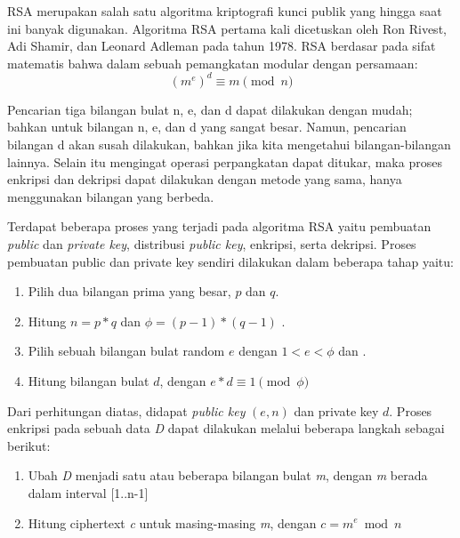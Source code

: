     RSA merupakan salah satu algoritma kriptografi kunci publik yang hingga saat ini banyak digunakan. Algoritma RSA pertama kali dicetuskan oleh Ron Rivest, Adi Shamir, dan Leonard Adleman pada tahun 1978. RSA berdasar pada sifat matematis bahwa dalam sebuah pemangkatan modular dengan persamaan:
    \begin{equation}
      (m^e)^d  \equiv  m \pmod{n}
    \end{equation}

    Pencarian tiga bilangan bulat n, e, dan d dapat dilakukan dengan mudah; bahkan untuk bilangan n, e, dan d yang sangat besar. Namun, pencarian bilangan d akan susah dilakukan, bahkan jika kita mengetahui bilangan-bilangan lainnya. Selain itu mengingat operasi perpangkatan dapat ditukar, maka proses enkripsi dan dekripsi dapat dilakukan dengan metode yang sama, hanya menggunakan bilangan yang berbeda.

    Terdapat beberapa proses yang terjadi pada algoritma RSA yaitu pembuatan \textit{public} dan \textit{private key}, distribusi \textit{public key}, enkripsi, serta dekripsi. Proses pembuatan public dan private key sendiri dilakukan dalam beberapa tahap yaitu:

    \begin{enumerate}
      \item Pilih dua bilangan prima yang besar, $p$ dan $q$.
      \item Hitung $n = p*q$ dan $ \phi = (p-1)*(q-1)$ .
      \item Pilih sebuah bilangan bulat random $e$ dengan $ 1 < e < \phi$ dan .
      \item Hitung bilangan bulat $d$, dengan $ e*d  \equiv  1 \pmod{\phi} $
    \end{enumerate}

    Dari perhitungan diatas, didapat \textit{public key} $(e, n)$ dan private key $d$.
    Proses enkripsi pada sebuah data \textit{D} dapat dilakukan melalui beberapa langkah sebagai berikut:
    \begin{enumerate}
      \item Ubah \textit{D} menjadi satu atau beberapa bilangan bulat \textit{m}, dengan \textit{m} berada dalam interval [1..n-1]
      \item Hitung ciphertext \textit{c} untuk masing-masing \textit{m}, dengan $c = m^e \bmod n $
    \end{enumerate}
